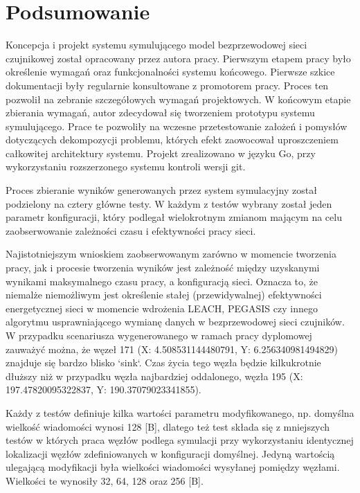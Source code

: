 \documentclass[a4paper,12pt,twoside,openany]{report}
\begin{document}
\chapter{Podsumowanie}
\par
Koncepcja i projekt systemu symulującego model bezprzewodowej sieci czujnikowej został opracowany przez autora pracy.
Pierwszym etapem pracy było określenie wymagań oraz funkcjonalności systemu końcowego. Pierwsze szkice dokumentacji były regularnie konsultowane z promotorem pracy.
Proces ten pozwolił na zebranie szczegółowych wymagań projektowych. W końcowym etapie zbierania wymagań, autor zdecydował się tworzeniem prototypu systemu symulującego.
Prace te pozwoliły na wczesne przetestowanie założeń i pomysłów dotyczących dekompozycji problemu, których efekt zaowocował uproszczeniem całkowitej architektury systemu.
Projekt zrealizowano w języku Go, przy wykorzystaniu rozszerzonego systemu kontroli wersji git.
\par
Proces zbieranie wyników generowanych przez system symulacyjny został podzielony na cztery główne testy.
W każdym z testów wybrany został jeden parametr konfiguracji, który podlegał wielokrotnym zmianom mającym na celu zaobserwowanie zależności czasu i efektywności pracy sieci.
\par
Najistotniejszym wnioskiem zaobserwowanym zarówno w momencie tworzenia pracy, jak i procesie tworzenia wyników jest zależność między uzyskanymi wynikami maksymalnego czasu pracy, a konfiguracją sieci.
Oznacza to, że niemalże niemożliwym jest określenie stałej (przewidywalnej) efektywności energetycznej sieci w momencie wdrożenia LEACH, PEGASIS czy innego algorytmu usprawniającego
wymianę danych w bezprzewodowej sieci czujników. W przypadku scenariusza wygenerowanego w ramach pracy dyplomowej zauważyć można, że węzeł 171 (X: 4.508531144480791, Y: 6.256340981494829) 
znajduje się bardzo blisko `sink`. Czas życia tego węzła będzie kilkukrotnie dłuższy niż w przypadku węzła najbardziej oddalonego, węzła 195 (X: 197.47820095322837, Y: 190.37079023341855).
\par
Każdy z testów definiuje kilka wartości parametru modyfikowanego, np. domyślna wielkość wiadomości wynosi 128 [B], dlatego też test składa się z mniejszych testów w których
praca węzłów podlega symulacji przy wykorzystaniu identycznej lokalizacji węzłów zdefiniowanych w konfiguracji domyślnej. Jedyną wartością ulegającą modyfikacji była
wielkości wiadomości wysyłanej pomiędzy węzłami. Wielkości te wynosiły 32, 64, 128 oraz 256 [B].
\par
\end{document}
